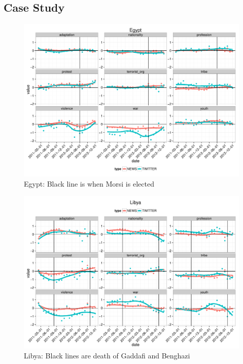
\subsection{Case Study}
\begin{figure}
	\centering
	\includegraphics[width=\textwidth]{imgs/egypt.pdf}
	\caption{Egypt: Black line is when Morsi is elected}
	\label{fig:egypt}
\end{figure}

\begin{figure}
	\centering
	\includegraphics[width=\textwidth]{imgs/libya.pdf}
	\caption{Libya: Black lines are death of Gaddafi and Benghazi }
	\label{fig:libya}
\end{figure}


